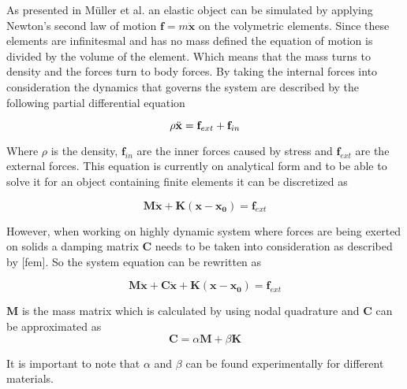 As presented in M\"uller et al. \cite{rt_phys} an elastic object can be simulated by applying Newton's second law of motion $\mathbf{f} = m\ddot{\mathbf{x}}$ on the volymetric elements. Since these elements are infinitesmal and has no mass defined the equation of motion is divided by the volume of the element. Which means that the mass turns to density and the forces turn to body forces. By taking the internal forces into consideration the dynamics that governs the system are described by the following partial differential equation  

\begin{equation}\label{eqn:contPDE}
    \rho \ddot{\bf x} ={\mathbf f}_{ext} + {\mathbf f}_{in}
\end{equation}

Where $\rho$ is the density, ${\mathbf f}_{in}$ are the inner forces caused by stress and ${\mathbf f}_{ext}$ are the external forces. This equation is currently on analytical form and to be able to solve it for an object containing finite elements it can be discretized as

\begin{equation}\label{eqn:discPDE}
\mathbf{M\ddot{x}} + \mathbf{K(x- x_0)} =  \mathbf{f}_{ext}
\end{equation}

However, when working on highly dynamic system where forces are being exerted on solids a damping matrix $\mathbf{C}$ needs to be taken into consideration as described by [fem]. So the system equation can be rewritten as

\begin{equation}\label{eqn:fullDiscPDE}
\mathbf{M\ddot{x}} + \mathbf{C\dot{x}} + \mathbf{K(x-x_0)} =  \mathbf{f}_{ext}
\end{equation}

$\mathbf{M}$ is the mass matrix which is calculated by using nodal quadrature \cite{hans} and $\mathbf{C}$ can be approximated as
\begin{equation}\label{eqn:BuildC}
\mathbf{\mathbf{C}} = \alpha \mathbf{M} + \beta \mathbf{K}
\end{equation}

It is important to note that $\alpha$ and $\beta$ can be found experimentally for different materials.
